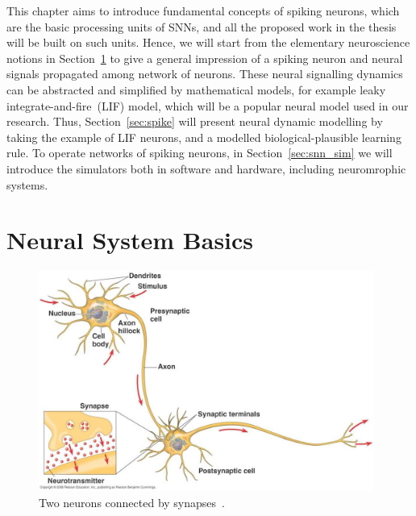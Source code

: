This chapter aims to introduce fundamental concepts of spiking neurons, which are the basic processing units of SNNs, and all the proposed work in the thesis will be built on such units.
Hence, we will start from the elementary neuroscience notions in Section~\ref{sec:neuron_basic} to give a general impression of a spiking neuron and neural signals propagated among network of neurons.
These neural signalling dynamics can be abstracted and simplified by mathematical models, for example leaky integrate-and-fire~(LIF) model, which will be a popular neural model used in our research.
Thus, Section~\ref{sec:spike} will present neural dynamic modelling by taking the example of LIF neurons, and a modelled biological-plausible learning rule.
To operate networks of spiking neurons, in Section~\ref{sec:snn_sim} we will introduce the simulators both in software and hardware, including neuromrophic systems.


\section{Neural System Basics}
\label{sec:neuron_basic}

	\begin{figure}[bt]
		\centering
		\includegraphics[width=0.98\textwidth]{pics_snn/neuron_pearson.jpg}
		\caption{Two neurons connected by synapses~\cite{reece2011campbell}.}
		\label{Fig:neuron_basic}
	\end{figure}

